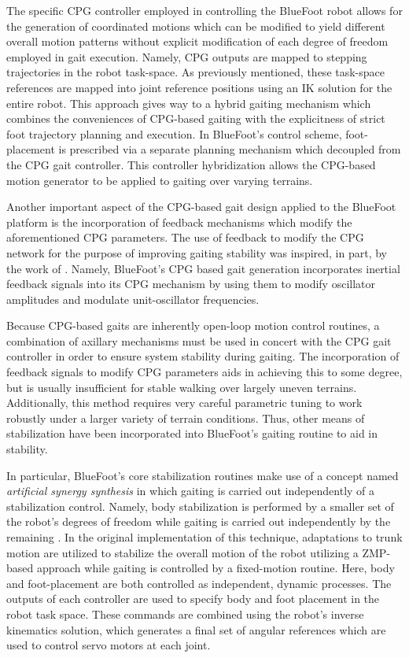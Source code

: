 		The specific CPG controller employed in controlling the BlueFoot robot allows for the generation of coordinated motions which can be modified to yield different overall motion patterns without explicit modification of each degree of freedom employed in gait execution. Namely, CPG outputs are mapped to stepping trajectories in the robot task-space. As previously mentioned, these task-space references are mapped into joint reference positions using an IK solution for the entire robot. This approach gives way to a hybrid gaiting mechanism which combines the conveniences of CPG-based gaiting with the explicitness of strict foot trajectory planning and execution. In BlueFoot's control scheme, foot-placement is prescribed via a separate planning mechanism which decoupled from the CPG gait controller. This controller hybridization allows the CPG-based motion generator to be applied to gaiting over varying terrains.

		Another important aspect of the CPG-based gait design applied to the BlueFoot platform is the incorporation of feedback mechanisms which modify the aforementioned CPG parameters. The use of feedback to modify the CPG network for the purpose of improving gaiting stability was inspired, in part, by the work of \cite{Fukuoka2003,Endo2004}. Namely, BlueFoot's CPG based gait generation incorporates inertial feedback signals into its CPG mechanism by using them to modify oscillator amplitudes and modulate unit-oscillator frequencies. 

		Because CPG-based gaits are inherently open-loop motion control routines, a combination of axillary mechanisms must be used in concert with the CPG gait controller in order to ensure system stability during gaiting. The incorporation of feedback signals to modify CPG parameters aids in achieving this to some degree, but is usually insufficient for stable walking over largely uneven terrains.  Additionally, this method requires very careful parametric tuning to work robustly under a larger variety of terrain conditions. Thus, other means of stabilization have been incorporated into BlueFoot's gaiting routine to aid in stability. 

		In particular, BlueFoot's core stabilization routines make use of a concept named \emph{artificial synergy synthesis} in which gaiting is carried out independently of a stabilization control. Namely, body stabilization is performed by a smaller set of the robot's degrees of freedom while gaiting is carried out independently by the remaining \cite{Vuko1972,Yamaguchi1993}. In the original implementation of this technique, adaptations to trunk motion are utilized to stabilize the overall motion of the robot utilizing a ZMP-based approach while gaiting is controlled by a fixed-motion routine. Here, body and foot-placement are both controlled as independent, dynamic processes. The outputs of each controller are used to specify body and foot placement in the robot task space. These commands are combined using the robot's inverse kinematics solution, which generates a final set of angular references which are used to control servo motors at each joint.




